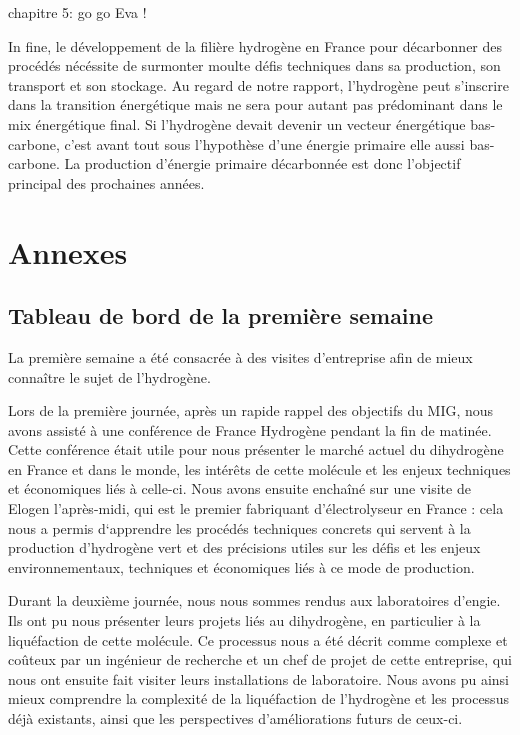 \documentclass[11pt,french,a4paper]{article}
\makeatletter
\newcommand\backmatter{%
    \clearpage
   }
\makeatother
\begin{document}
chapitre 5: go go Eva !

In fine, le développement de la filière hydrogène en France pour décarbonner des procédés nécéssite de surmonter moulte défis techniques dans sa production, son transport et son stockage. Au regard de notre rapport, l'hydrogène peut s'inscrire dans la transition énergétique mais ne sera pour autant pas prédominant dans le mix énergétique final. Si l'hydrogène devait devenir un vecteur énergétique bas-carbone, c'est avant tout sous l'hypothèse d'une énergie primaire elle aussi bas-carbone. La production d'énergie primaire décarbonnée est donc l'objectif principal des prochaines années. 


\newpage

\backmatter

\section*{Annexes} 

\subsection*{Tableau de bord de la première semaine}
La première semaine a été consacrée à des visites d'entreprise afin de mieux connaître le sujet de l'hydrogène.

Lors de la première journée,  après un rapide rappel des objectifs du MIG, nous avons assisté à une conférence de France Hydrogène pendant la fin de matinée. Cette conférence était utile pour nous présenter le marché actuel du dihydrogène en France et dans le monde, les intérêts de cette molécule et les enjeux techniques et économiques liés à celle-ci. 
Nous avons ensuite enchaîné sur une visite de Elogen l’après-midi, qui est le premier fabriquant d’électrolyseur en France : cela nous a permis d‘apprendre les procédés techniques concrets qui servent à la production d’hydrogène vert et des précisions utiles sur les défis et les enjeux environnementaux, techniques et économiques liés à ce mode de production. 

Durant la deuxième journée, nous nous sommes rendus aux laboratoires d’engie. Ils ont pu nous présenter leurs projets liés au dihydrogène, en particulier à la liquéfaction de cette molécule. Ce processus nous a été décrit comme complexe et coûteux par un ingénieur de recherche et un chef de projet de cette entreprise, qui nous ont ensuite fait visiter leurs installations de laboratoire. Nous avons pu ainsi mieux comprendre la complexité de la liquéfaction de l’hydrogène et les processus déjà existants, ainsi que les perspectives d’améliorations futurs de ceux-ci.
\end{document}
